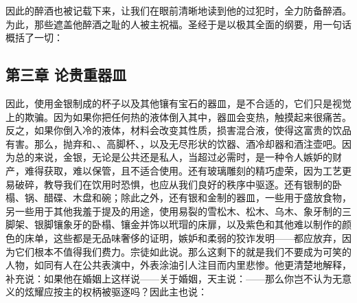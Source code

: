因此的醉酒也被记载下来，让我们在眼前清晰地读到他的过犯时，全力防备醉酒。为此，那些遮盖他醉酒之耻的人被主祝福。圣经于是以极其全面的纲要，用一句话概括了一切：\par


\subsection{第三章 论贵重器皿}

因此，使用金银制成的杯子以及其他镶有宝石的器皿，是不合适的，它们只是视觉上的欺骗。因为如果你把任何热的液体倒入其中，器皿会变热，触摸起来很痛苦。反之，如果你倒入冷的液体，材料会改变其性质，损害混合液，使得这富贵的饮品有害。那么，抛弃和、、高脚杯、，以及无尽形状的饮器、酒冷却器和酒注壶吧。因为总的来说，金银，无论是公共还是私人，当超过必需时，是一种令人嫉妒的财产，难得获取，难以保管，且不适合使用。还有玻璃雕刻的精巧虚荣，因为工艺更易破碎，教导我们在饮用时恐惧，也应从我们良好的秩序中驱逐。还有银制的卧榻、锅、醋碟、木盘和碗；除此之外，还有银和金制的器皿，一些用于盛放食物，另一些用于其他我羞于提及的用途，使用易裂的雪松木、松木、乌木、象牙制的三脚架、银脚镶象牙的卧榻、镶金并饰以玳瑁的床扉，以及紫色和其他难以制作的颜色的床单，这些都是无品味奢侈的证明，嫉妒和柔弱的狡诈发明——都应放弃，因为它们根本不值得我们费力。宗徒如此说。那么这剩下的就是我们不要成为可笑的人物，如同有人在公共表演中，外表涂油引人注目而内里悲惨。他更清楚地解释，补充说：如果他在婚姻上这样说——关于婚姻，天主说：——那么你岂不认为无意义的炫耀应按主的权柄被驱逐吗？因此主也说：\par

